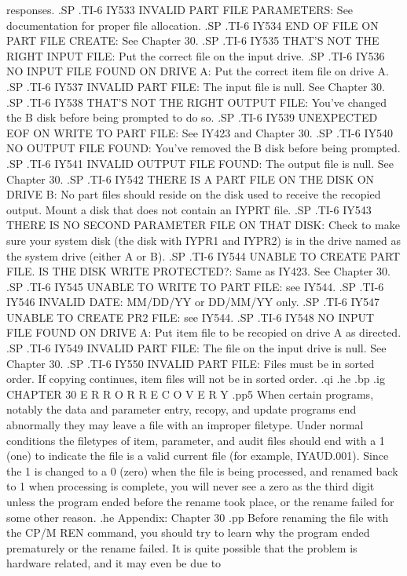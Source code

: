 responses.
.SP
.TI-6
IY533 INVALID PART FILE PARAMETERS: See documentation for proper file
allocation.
.SP
.TI-6
IY534 END OF FILE ON PART FILE CREATE: See Chapter 30.
.SP
.TI-6
IY535 THAT'S NOT THE RIGHT INPUT FILE: Put the correct file on the input
drive.
.SP
.TI-6
IY536 NO INPUT FILE FOUND ON DRIVE A: Put the correct item file on drive A.
.SP
.TI-6
IY537 INVALID PART FILE: The input file is null.  See Chapter 30.
.SP
.TI-6
IY538 THAT'S NOT THE RIGHT OUTPUT FILE: You've changed the B disk before
being prompted to do so.
.SP
.TI-6
IY539 UNEXPECTED EOF ON WRITE TO PART FILE: See IY423 and Chapter 30.
.SP
.TI-6
IY540 NO OUTPUT FILE FOUND: You've removed the B disk before being prompted.
.SP
.TI-6
IY541 INVALID OUTPUT FILE FOUND: The output file is null.  See Chapter 30.
.SP
.TI-6
IY542 THERE IS A PART FILE ON THE DISK ON DRIVE B: No part files should reside
on the disk used to receive the recopied output.  Mount a disk that does not
contain an IYPRT file.
.SP
.TI-6
IY543 THERE IS NO SECOND PARAMETER FILE ON THAT DISK: Check to make sure
your system disk (the disk with IYPR1 and IYPR2)
is in the drive named as the system drive (either A or B).
.SP
.TI-6
IY544 UNABLE TO CREATE PART FILE. IS THE DISK WRITE PROTECTED?: Same as IY423.
See Chapter 30.
.SP
.TI-6
IY545 UNABLE TO WRITE TO PART FILE: see IY544.
.SP
.TI-6
IY546 INVALID DATE: MM/DD/YY or DD/MM/YY only.
.SP
.TI-6
IY547 UNABLE TO CREATE PR2 FILE: see IY544.
.SP
.TI-6
IY548 NO INPUT FILE FOUND ON DRIVE A: Put item file to be recopied on drive A
as directed.
.SP
.TI-6
IY549 INVALID PART FILE: The file on the input drive is null.  See Chapter 30.
.SP
.TI-6
IY550 INVALID PART FILE: Files must be in sorted order.  If copying continues,
item files will not be in sorted order.
.qi
.he
.bp
.ig
CHAPTER 30
E R R O R    R E C O V E R Y
.pp5
When certain programs, notably the data and parameter entry, recopy, and
update programs end abnormally they may leave a file with an improper
filetype.  Under normal conditions the filetypes of item, parameter, and
audit files should end with a 1 (one) to indicate the file is a valid
current file (for example, IYAUD.001).	Since the 1 is changed to a 0 (zero)
when the file is being processed, and renamed back to 1 when processing
is complete, you will never see a zero as the third digit unless the program
ended before the rename took place, or the rename failed for some other reason.
.he Appendix: Chapter 30
.pp
Before renaming the file with the CP/M REN command, you should try to
learn why the program ended prematurely or the rename failed.  It is quite
possible that the problem is hardware related, and it may even be due to
